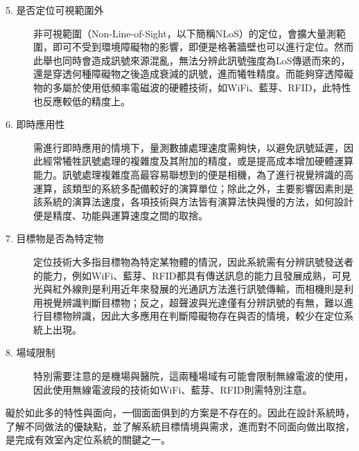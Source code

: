 \begin{description}
    


    
    \item[5. 是否定位可視範圍外] \hfill 
    
    \qquad
    非可視範圍（Non-Line-of-Sight，以下簡稱NLoS）的定位，會擴大量測範圍，即可不受到環境障礙物的影響，即便是格著牆壁也可以進行定位。然而此舉也同時會造成訊號來源混亂，無法分辨此訊號強度為LoS傳遞而來的，還是穿透何種障礙物之後造成衰減的訊號，進而犧牲精度。而能夠穿透障礙物的多屬於使用低頻率電磁波的硬體技術，如WiFi、藍芽、RFID，此特性也反應較低的精度上。


    \item[6. 即時應用性] \hfill 
    
    \qquad
    需進行即時應用的情境下，量測數據處理速度需夠快，以避免訊號延遲，因此經常犧牲訊號處理的複雜度及其附加的精度，或是提高成本增加硬體運算能力。訊號處理複雜度高最容易聯想到的便是相機，為了進行視覺辨識的高運算，該類型的系統多配備較好的演算單位\cite{survey_light2020}；除此之外，主要影響因素則是該系統的演算法速度，各項技術與方法皆有演算法快與慢的方法，如何設計便是精度、功能與運算速度之間的取捨。
    
    \item[7. 目標物是否為特定物] \hfill 
    
    \qquad
    定位技術大多指目標物為特定某物體的情況，因此系統需有分辨訊號發送者的能力，例如WiFi、藍芽、RFID都具有傳送訊息的能力且發展成熟\cite{survey:indoor_wayfinding}，可見光與紅外線則是利用近年來發展的光通訊方法進行訊號傳輸，而相機則是利用視覺辨識判斷目標物；反之，超聲波與光達僅有分辨訊號的有無，難以進行目標物辨識，因此大多應用在判斷障礙物存在與否的情境，較少在定位系統上出現。
    
    \item[8. 場域限制]\hfill 
    
    \qquad
    特別需要注意的是機場與醫院，這兩種場域有可能會限制無線電波的使用\cite{case:vlc_mobile}，因此使用無線電波段的技術如WiFi、藍芽、RFID則需特別注意。
\end{description}

礙於如此多的特性與面向，一個面面俱到的方案是不存在的。因此在設計系統時，了解不同做法的優缺點，並了解系統目標情境與需求，進而對不同面向做出取捨，是完成有效室內定位系統的關鍵之一\cite{survey_indoor2018}。














